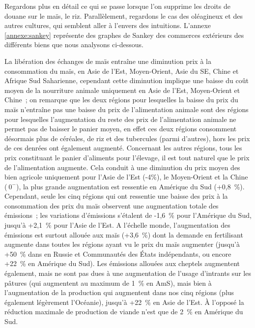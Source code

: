 Regardons plus en détail ce qui se passe lorsque l'on supprime les droits de douane sur le maïs, le riz. Parallèlement, regardons le cas des oléagineux et des autres cultures, qui semblent aller à l'envers des intuitions. L'annexe \ref{annexe:sankey} représente des graphes de Sankey des commerces extérieurs des différents biens que nous analysons ci-dessous.

La libération des échanges de maïs entraîne une diminution prix à la consommation du maïs, en Asie de l'Est, Moyen-Orient, Asie du SE, Chine et Afrique Sud Saharienne, cependant cette diminution implique une baisse du coût moyen de la nourriture animale uniquement en Asie de l'Est, Moyen-Orient et Chine~; on remarque que les deux régions pour lesquelles la baisse du prix du maïs n'entraîne pas une baisse du prix de l'alimentation animale sont des régions pour lesquelles l'augmentation du reste des prix de l'alimentation animale ne permet pas de baisser le panier moyen, en effet ces deux régions consomment désormais plus de céréales, de riz et des tubercules (parmi d'autres), hors les prix de ces denrées ont également augmenté. Concernant les autres régions, tous les prix constituant le panier d'aliments pour l'élevage, il est tout naturel que le prix de l'alimentation augmente. Cela conduit à une diminution du prix moyen des bien agricole uniquement pour l'Asie de l'Est (-4\%), le Moyen-Orient et la Chine ($~0^-$), la plus grande augmentation est ressentie en Amérique du Sud (+0,8~\%). Cependant, seule les cinq régions qui ont ressentie une baisse des prix à la consommation des prix du maïs observent une augmentation totale des émissions~; les variations d'émissions s’étalent de -1,6~\% pour l'Amérique du Sud, jusqu'à +2,1~\% pour l'Asie de l'Est. A l'échelle monde, l'augmentation des émissions est surtout allouée aux maïs (+3,6~\%) dont la demande en fertilisant augmente dans toutes les régions ayant vu le prix du maïs augmenter (jusqu'à +50~\% dans en Russie et Communautés des États indépendants, ou encore +22~\% en Amérique du Sud). Les émissions allouées aux cheptels augmentent également, mais ne sont pas dues à une augmentation de l'usage d'intrants sur les pâtures (qui augmentent au maximum de 1~\% en AmS), mais bien à l'augmentation de la production qui augmentent dans nos cinq régions (plus également légèrement l'Océanie), jusqu'à +22~\% en Asie de l'Est. À l'opposé la réduction maximale de production de viande n'est que de 2~\% en Amérique du Sud.

